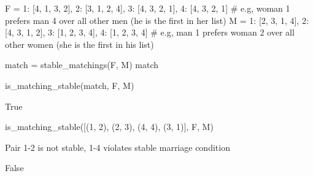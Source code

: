 \begin{sageCell}
    F = {1: [4, 1, 3, 2], 2: [3, 1, 2, 4], 3: [4, 3, 2, 1], 4: [4, 3, 2, 1]} # e.g, woman 1 prefers man 4 over all other men (he is the first in her list)
    M = {1: [2, 3, 1, 4], 2: [4, 3, 1, 2], 3: [1, 2, 3, 4], 4: [1, 2, 3, 4]} # e.g, man 1 prefers woman 2 over all other women (she is the first in his list)
\end{sageCell}

\begin{sageCell}
    match = stable_matchings(F, M)
    match
\end{sageCell}
\begin{outCell}
    [(1, 4), (2, 3), (4, 2), (3, 1)]
\end{outCell}

\begin{sageCell}
    is_matching_stable(match, F, M)
\end{sageCell}
\begin{outCell}
    True
\end{outCell}

\begin{sageCell}
    is_matching_stable([(1, 2), (2, 3), (4, 4), (3, 1)], F, M)
\end{sageCell}
Pair 1-2 is not stable, 1-4 violates stable marriage condition
\begin{outCell}
    False
\end{outCell}
